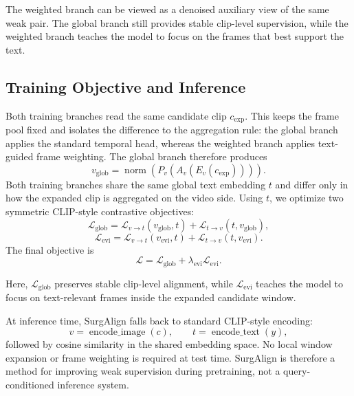 The weighted branch can be viewed as a denoised auxiliary view of the same weak pair. The global branch still provides stable clip-level supervision, while the weighted branch teaches the model to focus on the frames that best support the text.

\subsection{Training Objective and Inference}
\label{sec:method_objective}

Both training branches read the same candidate clip $c_{\mathrm{exp}}$. This keeps the frame pool fixed and isolates the difference to the aggregation rule: the global branch applies the standard temporal head, whereas the weighted branch applies text-guided frame weighting. The global branch therefore produces
\begin{equation}
v_{\mathrm{glob}} = \operatorname{norm}(P_v(A_v(E_v(c_{\mathrm{exp}})))).
\end{equation}
Both training branches share the same global text embedding $t$ and differ only in how the expanded clip is aggregated on the video side. Using $t$, we optimize two symmetric CLIP-style contrastive objectives:
\begin{equation}
\mathcal{L}_{\mathrm{glob}} =
\mathcal{L}_{v \rightarrow t}(v_{\mathrm{glob}}, t) +
\mathcal{L}_{t \rightarrow v}(t, v_{\mathrm{glob}}),
\end{equation}
\begin{equation}
\mathcal{L}_{\mathrm{evi}} =
\mathcal{L}_{v \rightarrow t}(v_{\mathrm{evi}}, t) +
\mathcal{L}_{t \rightarrow v}(t, v_{\mathrm{evi}}).
\end{equation}
The final objective is
\begin{equation}
\mathcal{L} =
\mathcal{L}_{\mathrm{glob}}
 + \lambda_{\mathrm{evi}} \mathcal{L}_{\mathrm{evi}}.
\end{equation}

Here, $\mathcal{L}_{\mathrm{glob}}$ preserves stable clip-level alignment, while $\mathcal{L}_{\mathrm{evi}}$ teaches the model to focus on text-relevant frames inside the expanded candidate window.

At inference time, SurgAlign falls back to standard CLIP-style encoding:
\begin{equation}
v = \operatorname{encode\_image}(c), \qquad
t = \operatorname{encode\_text}(y),
\end{equation}
followed by cosine similarity in the shared embedding space. No local window expansion or frame weighting is required at test time. SurgAlign is therefore a method for improving weak supervision during pretraining, not a query-conditioned inference system.
